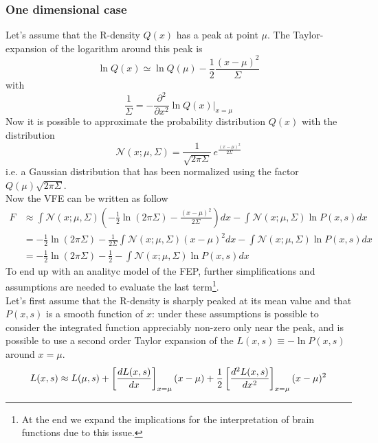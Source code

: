 \documentclass[a4paper, 10pt]{article}
\begin{document}
\subsubsection*{One dimensional case}
Let's assume that the R-density $Q(x)$ has a peak at point $\mu$. The Taylor-expansion of the logarithm around this peak is
\begin{equation}
\ln Q(x) \simeq \ln Q(\mu) - \frac{1}{2} \frac{(x-\mu)^2}{\Sigma} 
\end{equation}
with
\begin{equation}
\frac{1}{\Sigma} = - \frac{\partial^{2} }{\partial x^2} \ln Q(x) \bigg\rvert_{x=\mu} 
\end{equation}
Now it is possible to approximate the probability distribution $Q(x)$ with the distribution
\begin{equation}
\mathcal{N}(x;\mu, \Sigma) = \frac{1}{\sqrt{ 2 \pi \Sigma}} \, e^{\frac{(x-\mu)^2}{2 \Sigma}}
\end{equation}
i.e. a Gaussian distribution that has been normalized using the factor $Q(\mu) \sqrt{2 \pi \Sigma }$.\\
Now the VFE can be written as follow
\begin{equation}
\begin{split}
F   & \approx \int \mathcal{N}(x;\mu,\Sigma) (-\frac{1}{2} \ln (2 \pi \Sigma) - \frac{(x-\mu)^2}{2 \Sigma} ) d x - \int \mathcal{N}(x;\mu,\Sigma) \ln P(x,s) d x \\
    & = -\frac{1}{2} \ln (2 \pi \Sigma) - \frac{1}{2 \Sigma} \int \mathcal{N}(x;\mu,\Sigma) (x-\mu)^2  d x - \int \mathcal{N}(x;\mu,\Sigma) \ln P(x,s) d x \\
    & = -\frac{1}{2} \ln (2 \pi \Sigma) - \frac{1}{2} - \int \mathcal{N}(x;\mu,\Sigma) \ln P(x,s) d x
\end{split}
\end{equation}
To end up with an analityc model of the FEP, further simplifications and assumptions are needed to evaluate the last term\footnote{At the end we expand the implications for the interpretation of brain functions due to this issue.}. \\
Let's first assume that the R-density is sharply peaked at its mean value and that $P(x,s)$ is a smooth function of $x$: under these assumptions is possible to consider the integrated function appreciably non-zero only near the peak, and is possible to use a second order Taylor expansion of the $L(x,s) \equiv - \ln P(x,s)$ around $x=\mu$.
\begin{equation}
L(x,s) \approx L(\mu,s) + \left[ \frac{dL(x,s)}{dx} \right]_{x=\mu} (x-\mu) + \frac{1}{2} \left[ \frac{d^2L(x,s)}{dx^2} \right]_{x=\mu} (x-\mu)^2 \\
\end{equation}
\end{document}
